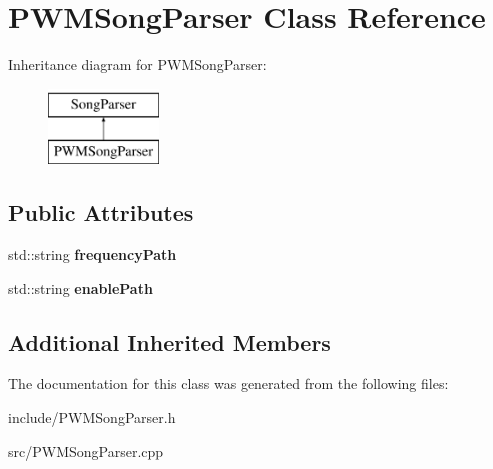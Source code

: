 \hypertarget{classPWMSongParser}{\section{P\-W\-M\-Song\-Parser Class Reference}
\label{classPWMSongParser}
}
Inheritance diagram for P\-W\-M\-Song\-Parser\-:\begin{figure}[H]
\begin{center}
\leavevmode
\includegraphics[height=2.000000cm]{classPWMSongParser}
\end{center}
\end{figure}
\subsection*{Public Attributes}
\begin{DoxyCompactItemize}
\item 
\hypertarget{classPWMSongParser_ab6ef175e8f80211c9648494677128e9e}{std\-::string {\bfseries frequency\-Path}}\label{classPWMSongParser_ab6ef175e8f80211c9648494677128e9e}

\item 
\hypertarget{classPWMSongParser_af5feb204b64739f4c24b5cb5637fcc4f}{std\-::string {\bfseries enable\-Path}}\label{classPWMSongParser_af5feb204b64739f4c24b5cb5637fcc4f}

\end{DoxyCompactItemize}
\subsection*{Additional Inherited Members}


The documentation for this class was generated from the following files\-:\begin{DoxyCompactItemize}
\item 
include/P\-W\-M\-Song\-Parser.\-h\item 
src/P\-W\-M\-Song\-Parser.\-cpp\end{DoxyCompactItemize}
